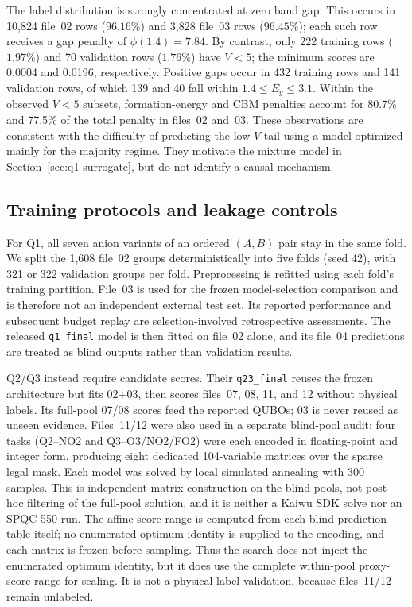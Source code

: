 The label distribution is strongly concentrated at zero band gap.
This occurs in 10,824 file~02 rows ($96.16\%$) and 3,828 file~03 rows
($96.45\%$); each such row receives a gap penalty of
$\phi(1.4)=7.84$.  By contrast, only 222 training rows ($1.97\%$) and
70 validation rows ($1.76\%$) have $V<5$; the minimum scores are 0.0004
and 0.0196, respectively.  Positive gaps occur in 432 training rows and
141 validation rows, of which 139 and 40 fall within
$1.4\le E_g\le3.1$.  Within the observed $V<5$ subsets, formation-energy
and CBM penalties account for 80.7\% and 77.5\% of the total penalty in
files~02 and~03.  These observations are consistent with the difficulty of predicting
the low-$V$ tail using a model optimized mainly for the majority regime.
They motivate the mixture model in Section~\ref{sec:q1-surrogate}, but do
not identify a causal mechanism.

\subsection{Training protocols and leakage controls}

For Q1, all seven anion variants of an ordered $(A,B)$ pair stay in the
same fold.  We split the 1,608 file~02 groups deterministically into five
folds (seed 42), with 321 or 322 validation groups per fold.  Preprocessing
is refitted using each fold's training partition.  File~03 is used for the frozen model-selection comparison and is
therefore not an independent external test set.  Its reported performance
and subsequent budget replay are selection-involved retrospective
assessments.  The released \texttt{q1\_final} model is then fitted on
file~02 alone, and its file~04 predictions are treated as blind outputs
rather than validation results.

Q2/Q3 instead require candidate scores.  Their \texttt{q23\_final} reuses
the frozen architecture but fits 02+03, then scores files~07, 08, 11, and 12
without physical labels.  Its full-pool 07/08 scores feed the reported QUBOs;
03 is never reused as unseen evidence.  Files~11/12 were also used in a
separate blind-pool audit: four tasks (Q2--NO2 and Q3--O3/NO2/FO2) were each
encoded in floating-point and integer form, producing eight dedicated
104-variable matrices over the sparse legal mask.  Each model was solved by
local simulated annealing with 300 samples.  This is independent matrix
construction on the blind pools, not post-hoc filtering of the full-pool
solution, and it is neither a Kaiwu SDK solve nor an SPQC-550 run.  The
affine score range is computed from each blind prediction table itself; no
enumerated optimum identity is supplied to the encoding, and each matrix is
frozen before sampling.  Thus the search does not inject the enumerated
optimum identity, but it does use the complete within-pool proxy-score range
for scaling.  It is not a physical-label validation, because
files~11/12 remain unlabeled.

